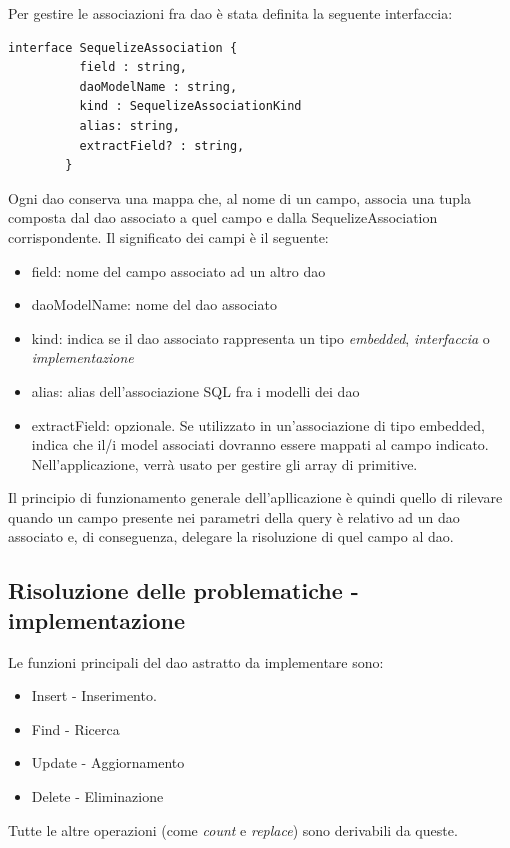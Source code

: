\documentclass[a4paper, 12pt]{scrartcl}
\begin{document}
      Per gestire le associazioni fra dao è stata definita la seguente interfaccia:
      \begin{Verbatim}[samepage=true]
        interface SequelizeAssociation {
          field : string,
          daoModelName : string,
          kind : SequelizeAssociationKind
          alias: string,
          extractField? : string,
        }
      \end{Verbatim}
      Ogni dao conserva una mappa che, al nome di un campo, associa una tupla composta dal dao associato a quel campo e dalla SequelizeAssociation corrispondente.
      Il significato dei campi è il seguente:
      \begin{itemize}
        \item field: nome del campo associato ad un altro dao
        \item daoModelName: nome del dao associato
        \item kind: indica se il dao associato rappresenta un tipo \emph{embedded}, \emph{interfaccia} o \emph{implementazione}
        \item alias: alias dell'associazione SQL fra i modelli dei dao
        \item extractField: opzionale. Se utilizzato in un'associazione di tipo embedded, indica che il/i model associati dovranno essere mappati al campo indicato.
                            Nell'applicazione, verrà usato per gestire gli array di primitive.
      \end{itemize}
      Il principio di funzionamento generale dell'apllicazione è quindi quello di rilevare quando un campo presente nei parametri della query è relativo ad un dao associato e, di conseguenza, delegare la risoluzione di quel campo al dao.
    \newpage

    \subsection*{Risoluzione delle problematiche - implementazione}
      Le funzioni principali del dao astratto da implementare sono:
      \begin{itemize}
        \item Insert - Inserimento.
        \item Find   - Ricerca
        \item Update - Aggiornamento
        \item Delete - Eliminazione
      \end{itemize}
      Tutte le altre operazioni (come \emph{count} e \emph{replace}) sono derivabili da queste.\\
\end{document}
